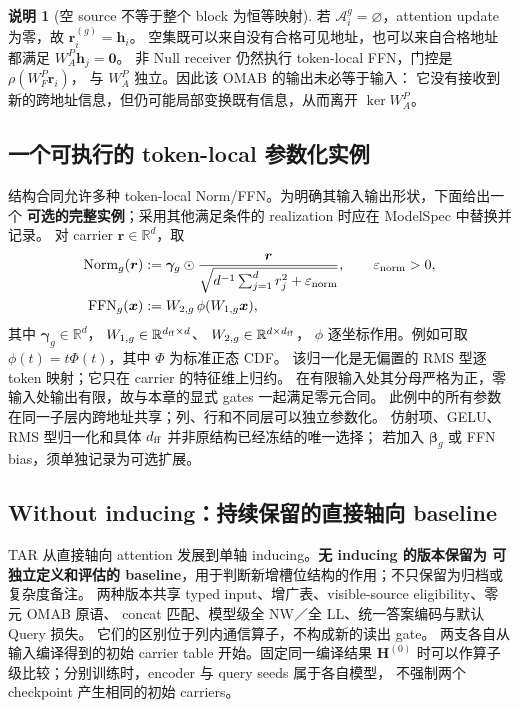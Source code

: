 \documentclass[11pt,UTF8,fontset=fandol]{ctexart}
\numberwithin{equation}{section}
\theoremstyle{definition}
\newtheorem{remark}[definition]{说明}
\newcommand{\R}{\mathbb R}
\begin{document}
\begin{remark}[空 source 不等于整个 block 为恒等映射]
若 $\mathcal A_i^g=\varnothing$，attention update 为零，故
$\bm r_i^{(g)}=\bm h_i$。
空集既可以来自没有合格可见地址，也可以来自合格地址都满足 $W_A^{P}\bm h_j=\bm0$。
非 Null receiver 仍然执行 token-local FFN，门控是 $\rho(W_F^{P}\bm r_i)$，
与 $W_A^{P}$ 独立。因此该 OMAB 的输出未必等于输入：
它没有接收到新的跨地址信息，但仍可能局部变换既有信息，从而离开 $\ker W_A^{P}$。
\end{remark}



\subsection{一个可执行的 token-local 参数化实例}

结构合同允许多种 token-local Norm/FFN。为明确其输入输出形状，下面给出一个
\textbf{可选的完整实例}；采用其他满足条件的 realization 时应在 ModelSpec 中替换并记录。
对 carrier $\bm r\in\R^d$，取
\begin{equation}
\begin{aligned}
 \operatorname{Norm}_g(\bm r)
 &:=\bm\gamma_g\odot
   \frac{\bm r}{\sqrt{d^{-1}\sum_{j=1}^d r_j^2+\varepsilon_{\rm norm}}}
   ,\qquad\varepsilon_{\rm norm}>0,\\
 \operatorname{FFN}_g(\bm x)
 &:=W_{2,g}\,\phi(W_{1,g}\bm x),
\end{aligned}
\end{equation}
其中 $\bm\gamma_g\in\R^d$，
$W_{1,g}\in\R^{d_{\rm ff}\times d}$、
$W_{2,g}\in\R^{d\times d_{\rm ff}}$，
$\phi$ 逐坐标作用。例如可取 $\phi(t)=t\Phi(t)$，其中 $\Phi$ 为标准正态 CDF。
该归一化是无偏置的 RMS 型逐 token 映射；它只在 carrier 的特征维上归约。
在有限输入处其分母严格为正，零输入处输出有限，故与本章的显式 gates 一起满足零元合同。
此例中的所有参数在同一子层内跨地址共享；列、行和不同层可以独立参数化。
仿射项、GELU、RMS 型归一化和具体 $d_{\rm ff}$ 并非原结构已经冻结的唯一选择；
若加入 $\bm\beta_g$ 或 FFN bias，须单独记录为可选扩展。

\subsection{Without inducing：持续保留的直接轴向 baseline}
\label{subsec:A:direct-baseline}

TAR 从直接轴向 attention 发展到单轴 inducing。\textbf{无 inducing 的版本保留为
可独立定义和评估的 baseline}，用于判断新增槽位结构的作用；不只保留为归档或复杂度备注。
两种版本共享 typed input、增广表、visible-source eligibility、零元 OMAB 原语、
concat 匹配、模型级全 NW／全 LL、统一答案编码与默认 Query 损失。
它们的区别位于列内通信算子，不构成新的读出 gate。
两支各自从输入编译得到的初始 carrier table 开始。固定同一编译结果 $\bm H^{(0)}$
时可以作算子级比较；分别训练时，encoder 与 query seeds 属于各自模型，
不强制两个 checkpoint 产生相同的初始 carriers。
\end{document}
